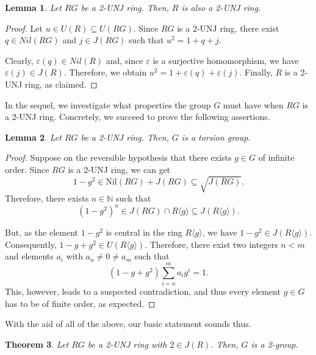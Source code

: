 \documentclass[12pt]{amsart}
\newtheorem{theorem}{Theorem}[section]
\newtheorem{lemma}[theorem]{Lemma}
\theoremstyle{definition}
\begin{document}
\begin{lemma}
Let $RG$ be a 2-UNJ ring. Then, $R$ is also a 2-UNJ ring.
\end{lemma}

\begin{proof}
Let $u \in U(R) \subseteq U(RG)$. Since $RG$ is a 2-UNJ ring, there exist $q \in Nil(RG)$ and $j \in J(RG)$ such that $u^2 = 1 + q + j$.

Clearly, $\varepsilon(q) \in Nil(R)$ and, since $\varepsilon$ is a surjective homomorphism, we have $\varepsilon(j) \in J(R)$. Therefore, we obtain $u^2 = 1 + \varepsilon(q) + \varepsilon(j)$. Finally, $R$ is a 2-UNJ ring, as claimed.
\end{proof}

In the sequel, we investigate what properties the group $G$ must have when $RG$ is a 2-UNJ ring. Concretely, we succeed to prove the following assertions.

\begin{lemma}
Let $RG$ be a 2-UNJ ring. Then, $G$ is a torsion group.
\end{lemma}

\begin{proof}
Suppose on the reversible hypothesis that there exists $g \in G$ of infinite order. Since $RG$ is a 2-UNJ ring, we can get $$1-g^2 \in \text{Nil}(RG) + J(RG) \subseteq \sqrt{J(RG)}.$$ Therefore, there exists $n \in \mathbb{N}$ such that $$(1-g^2)^n \in J(RG) \cap R\langle g\rangle \subseteq J(R\langle g\rangle).$$

But, as the element $1-g^2$ is central in the ring $R\langle g\rangle$, we have $1-g^2 \in J(R\langle g\rangle)$. Consequently, $1-g+g^2 \in U(R\langle g\rangle)$. Therefore, there exist two integers $n < m$ and elements $a_i$ with $a_n \neq 0 \neq a_m$ such that
\[
(1 - g + g^2)\sum_{i=n}^{m}a_ig^i=1.
\]
This, however, leads to a suspected contradiction, and thus every element $g \in G$ has to be of finite order, as expected.
\end{proof}

With the aid of all of the above, our basic statement sounds thus.

\begin{theorem}\label{2 group ring}
Let $RG$ be a 2-UNJ ring with $2 \in J(R)$. Then, $G$ is a 2-group.
\end{theorem}
\end{document}

